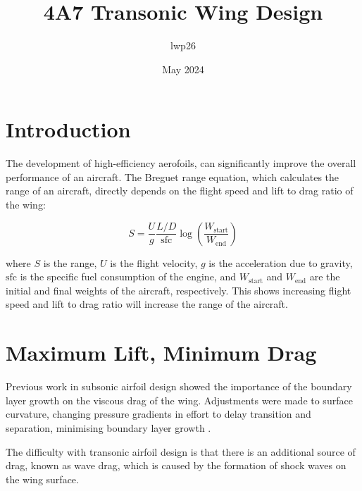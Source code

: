 \documentclass[11pt]{article}
\begin{document}
\title{4A7 Transonic Wing Design}
\author{lwp26}
\date{May 2024}
\maketitle

\section{Introduction}


The development of high-efficiency aerofoils, can significantly improve the overall performance of an aircraft.
The Breguet range equation, which calculates the range of an aircraft, directly depends on the flight speed and lift to drag ratio of the wing:

\begin{equation}
S = \frac{U}{g}\frac{L/D}{\text{sfc}} \log \left( \frac{W_\text{start}}{W_\text{end}} \right)
\end{equation}

where $S$ is the range, $U$ is the flight velocity, $g$ is the acceleration due to gravity, $\text{sfc}$ is the specific fuel consumption of the engine, and $W_\text{start}$ and $W_\text{end}$ are the initial and final weights of the aircraft, respectively.
This shows increasing flight speed and lift to drag ratio will increase the range of the aircraft.

\section{Maximum Lift, Minimum Drag}

Previous work in subsonic airfoil design showed the importance of the boundary layer growth on the viscous drag of the wing.
Adjustments were made to surface curvature, changing pressure gradients in effort to delay transition and separation, minimising boundary layer growth \cite{SA1_report}.

The difficulty with transonic airfoil design is that there is an additional source of drag, known as wave drag, which is caused by the formation of shock waves on the wing surface.


\end{document}
